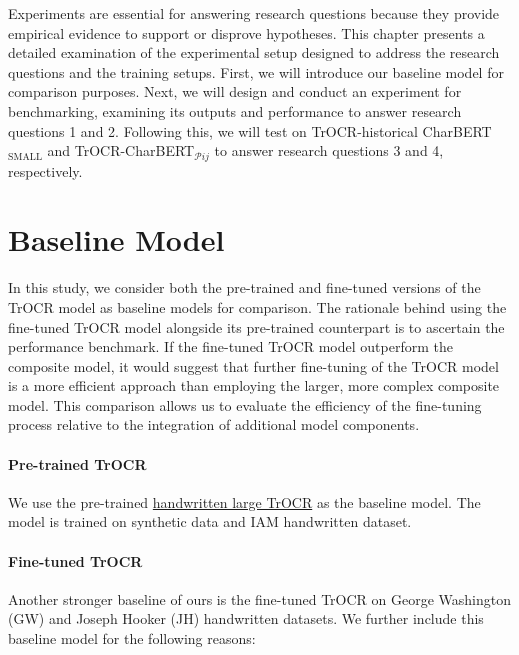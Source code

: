 \label{chap:4_experiment}
Experiments are essential for answering research questions because they provide empirical evidence to support or disprove hypotheses. This chapter presents a detailed examination of the experimental setup designed to address the research questions and the training setups. First, we will introduce our baseline model for comparison purposes. Next, we will design and conduct an experiment for benchmarking, examining its outputs and performance to answer research questions 1 and 2. Following this, we will test on TrOCR-historical CharBERT$_{\text{SMALL}}$ and TrOCR-CharBERT$_{\mathcal{P}{ij}}$ to answer research questions 3 and 4, respectively.
\section{Baseline Model}
\label{sec:4_baseline_model}
In this study, we consider both the pre-trained and fine-tuned versions of the TrOCR model as baseline models for comparison. The rationale behind using the fine-tuned TrOCR model alongside its pre-trained counterpart is to ascertain the performance benchmark. If the fine-tuned TrOCR model outperform the composite model, it would suggest that further fine-tuning of the TrOCR model is a more efficient approach than employing the larger, more complex composite model. This comparison allows us to evaluate the efficiency of the fine-tuning process relative to the integration of additional model components.
\paragraph*{Pre-trained TrOCR}
\label{par:4_pre-trained_trocr}
We use the pre-trained \href{https://huggingface.co/microsoft/trocr-large-handwritten}{handwritten large TrOCR} as the baseline model. The model is trained on synthetic data and IAM handwritten dataset.
\paragraph*{Fine-tuned TrOCR}
\label{par:4_fine_tuned_trocr}
Another stronger baseline of ours is the fine-tuned TrOCR on George Washington (GW) and Joseph Hooker (JH) handwritten datasets. We further include this baseline model for the following reasons: 

